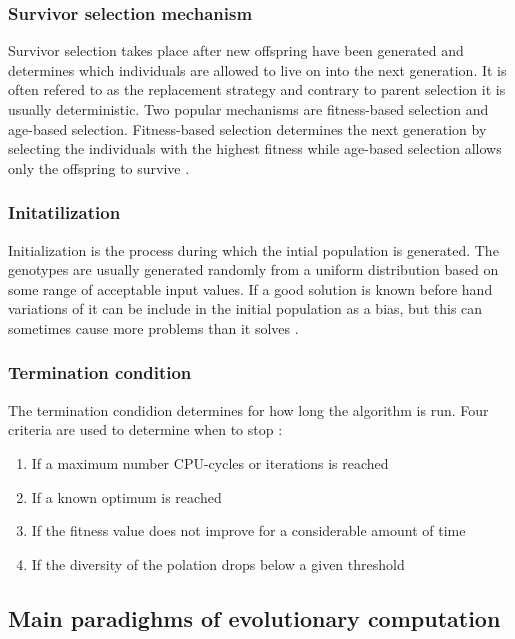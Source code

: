 \subsubsection{Survivor selection mechanism}

Survivor selection takes place after new offspring have been generated and determines which individuals are allowed to live on into the next generation. It is often refered to as the replacement strategy and contrary to parent selection it is usually deterministic. Two popular mechanisms are fitness-based selection and age-based selection. Fitness-based selection determines the next generation by selecting the individuals with the highest fitness while age-based selection allows only the offspring to survive \cite{Eiben2015_whatevolutionary}.

\subsubsection{Initatilization}

Initialization is the process during which the intial population is generated. The genotypes are usually generated randomly from a uniform distribution based on some range of acceptable input values. If a good solution is known before hand variations of it can be include in the initial population as a bias, but this can sometimes cause more problems than it solves \cite{Eiben20021}.

\subsubsection{Termination condition}

The termination condidion determines for how long the algorithm is run. Four criteria are used to determine when to stop \cite{Eiben2015_whatevolutionary}:

\begin{enumerate}
  \item If a maximum number CPU-cycles or iterations is reached
  \item If a known optimum is reached
  \item If the fitness value does not improve for a considerable amount of time
  \item If the diversity of the polation drops below a given threshold
\end{enumerate}

\subsection{Main paradighms of evolutionary computation}


